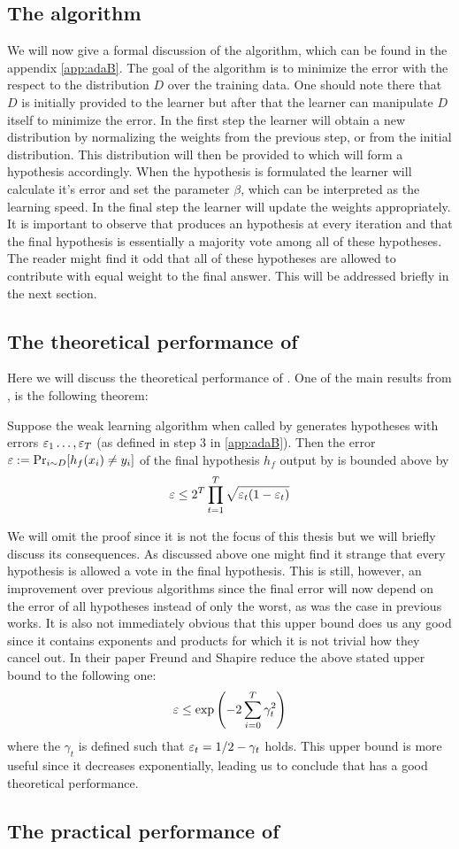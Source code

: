 \subsection{The algorithm}
\label{subsec:algo}
We will now give a formal discussion of the \adaB\cite{Freund1997} algorithm, which can be found in the appendix \ref{app:adaB}. The goal of the algorithm is to minimize the error with the respect to the distribution $D$ over the training data. One should note there that $D$ is initially provided to the learner but after that the learner can manipulate $D$ itself to minimize the error. In the first step the learner will obtain a new distribution by normalizing the weights from the previous step, or from the initial distribution. This distribution will then be provided to \weak which will form a hypothesis accordingly. When the hypothesis is formulated the learner will calculate it's error and set the parameter $\beta$, which can be interpreted as the learning speed. In the final step the learner will update the weights appropriately. It is important to observe that \weak produces an hypothesis at every iteration and that the final hypothesis is essentially a majority vote among all of these hypotheses. The reader might find it odd that all of these hypotheses are allowed to contribute with equal weight to the final answer. This will be addressed briefly in the next section.  

\subsection{The theoretical performance of \adaB}
\label{subsec:perf}
Here we will discuss the theoretical performance of \adaB. One of the main results from \cite{Freund1997}, is the following theorem: 
\begin{theorem}\label{thm:adaErr}\cite{Freund1997}
Suppose the weak learning algorithm \weak when called by \adaB generates hypotheses with errors $\varepsilon_1\ldots, \varepsilon_T$ (as defined in step 3 in \ref{app:adaB}). Then the error \\$\varepsilon:=\Pr_{i\sim D}[h_f(x_i)\neq y_i]$ of the final hypothesis $h_f$ output by \adaB is bounded above by $$\varepsilon\leq 2^T\prod^T_{t=1}\sqrt{\varepsilon_t(1-\varepsilon_t)}$$
\end{theorem}
We will omit the proof since it is not the focus of this thesis but we will briefly discuss its consequences. As discussed above one might find it strange that every hypothesis is allowed a vote in the final hypothesis. This is still, however, an improvement over previous algorithms since the final error will now depend on the error of all hypotheses instead of only the worst, as was the case in previous works. It is also not immediately obvious that this upper bound does us any good since it contains exponents and products for which it is not trivial how they cancel out. In their paper Freund and Shapire reduce the above stated upper bound to the following one: $$\varepsilon\leq \exp\left(-2\sum^T_{i=0}\gamma_t^2\right)$$ where the $\gamma_t$ is defined such that $\varepsilon_t=1/2-\gamma_t$ holds. This upper bound is more useful since it decreases exponentially, leading us to conclude that \adaB has a good theoretical performance.   

\subsection{The practical performance of \adaB}
\label{subsec:pracPerf}

